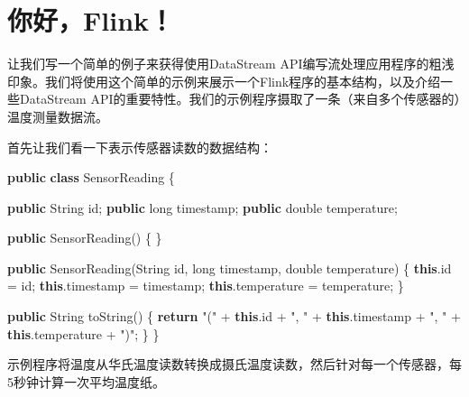 \documentclass[cn,11pt,chinese]{elegantbook}
\newenvironment{Shaded}{}{}
\newcommand{\BuiltInTok}[1]{#1}
\newcommand{\DataTypeTok}[1]{\textcolor[rgb]{0.56,0.13,0.00}{#1}}
\newcommand{\FunctionTok}[1]{\textcolor[rgb]{0.02,0.16,0.49}{#1}}
\newcommand{\KeywordTok}[1]{\textcolor[rgb]{0.00,0.44,0.13}{\textbf{#1}}}
\newcommand{\NormalTok}[1]{#1}
\newcommand{\StringTok}[1]{\textcolor[rgb]{0.25,0.44,0.63}{#1}}
\begin{document}
\hypertarget{ux4f60ux597dflink}{%
\section{你好，Flink！}\label{ux4f60ux597dflink}}

让我们写一个简单的例子来获得使用DataStream
API编写流处理应用程序的粗浅印象。我们将使用这个简单的示例来展示一个Flink程序的基本结构，以及介绍一些DataStream
API的重要特性。我们的示例程序摄取了一条（来自多个传感器的）温度测量数据流。

首先让我们看一下表示传感器读数的数据结构：

\begin{Shaded}
\begin{Highlighting}[]
\KeywordTok{public} \KeywordTok{class}\NormalTok{ SensorReading \{}

    \KeywordTok{public} \BuiltInTok{String}\NormalTok{ id;}
    \KeywordTok{public} \DataTypeTok{long}\NormalTok{ timestamp;}
    \KeywordTok{public} \DataTypeTok{double}\NormalTok{ temperature;}

    \KeywordTok{public} \FunctionTok{SensorReading}\NormalTok{() \{ \}}

    \KeywordTok{public} \FunctionTok{SensorReading}\NormalTok{(}\BuiltInTok{String}\NormalTok{ id, }\DataTypeTok{long}\NormalTok{ timestamp, }\DataTypeTok{double}\NormalTok{ temperature) \{}
        \KeywordTok{this}\NormalTok{.}\FunctionTok{id}\NormalTok{ = id;}
        \KeywordTok{this}\NormalTok{.}\FunctionTok{timestamp}\NormalTok{ = timestamp;}
        \KeywordTok{this}\NormalTok{.}\FunctionTok{temperature}\NormalTok{ = temperature;}
\NormalTok{    \}}

    \KeywordTok{public} \BuiltInTok{String} \FunctionTok{toString}\NormalTok{() \{}
        \KeywordTok{return} \StringTok{"("}\NormalTok{ + }\KeywordTok{this}\NormalTok{.}\FunctionTok{id}\NormalTok{ + }\StringTok{", "}\NormalTok{ + }\KeywordTok{this}\NormalTok{.}\FunctionTok{timestamp}\NormalTok{ + }\StringTok{", "}\NormalTok{ + }\KeywordTok{this}\NormalTok{.}\FunctionTok{temperature}\NormalTok{ + }\StringTok{")"}\NormalTok{;}
\NormalTok{    \}}
\NormalTok{\}}
\end{Highlighting}
\end{Shaded}

示例程序将温度从华氏温度读数转换成摄氏温度读数，然后针对每一个传感器，每5秒钟计算一次平均温度纸。
\end{document}
